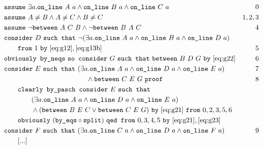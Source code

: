 \begin{boxedfigure}
\begin{align*}
& \code{assume}\ \exists a. \code{on\_line}\ A\ a\wedge\code{on\_line}\ B\ a\wedge\code{on\_line}\ C\ a & 0\\
& \code{assume}\ A\neq B \wedge A\neq C \wedge B \neq C & 1,2,3\\
& \code{assume}\ \neg\between{A}{C}{B} \wedge \neg\between{B}{A}{C} & 4\\
& \code{consider}\ D\ \code{such that}\ \Triangle{a}{A}{B}{D}\\
& \qquad\code{from}\ 1\ \code{by}\ \eqref{eq:g12},\eqref{eq:g13b}& 5\\
& \code{obviously by\_neqs}\ \code{so consider}\ G\ \code{such that}\ \between{B}{D}{G}\ \code{by}\ \eqref{eq:g22} & 6\\
& \code{consider}\ E\ \code{such that}\ (\exists a. \code{on\_line}\ A\ a\wedge \code{on\_line}\ D\ a\wedge \code{on\_line}\ E\ a) & 7\\
& \qquad\qquad\qquad\qquad\qquad\qquad \wedge\between{C}{E}{G}\ \code{proof} & 8\\
&\qquad \code{clearly by\_pasch consider}\ E\ \code{such that}\\
&\qquad\qquad (\exists a. \code{on\_line}\ A\ a\wedge \code{on\_line}\ D\ a\wedge \code{on\_line}\ E\ a)\\
&\qquad\qquad \wedge (\between{B}{E}{C} \vee \between{C}{E}{G})\ \code{by}\ \eqref{eq:g21}\ \code{from}\ 0,2,3,5,6\\
&\qquad\code{obviously}\ (\code{by\_eqs}\circ\code{split})\ \code{qed from}\ 0,3,4,5\ \code{by}\ \eqref{eq:g21},\eqref{eq:g23}\\
& \code{consider}\ F\ \code{such that}\ (\exists a. \code{on\_line}\ C\ a\wedge \code{on\_line}\ D\ a\wedge \code{on\_line}\ F\ a) & 9\\
&\qquad[...]\\

\end{align*}
\end{boxedfigure}
